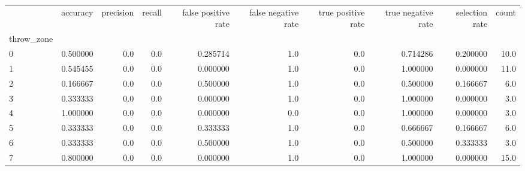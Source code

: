 \begin{tabular}{lrrrrrrrrr}
\toprule
{} &  accuracy &  precision &  recall &  false positive rate &  false negative rate &  true positive rate &  true negative rate &  selection rate &  count \\
throw\_zone &           &            &         &                      &                      &                     &                     &                 &        \\
\midrule
0          &  0.500000 &        0.0 &     0.0 &             0.285714 &                  1.0 &                 0.0 &            0.714286 &        0.200000 &   10.0 \\
1          &  0.545455 &        0.0 &     0.0 &             0.000000 &                  1.0 &                 0.0 &            1.000000 &        0.000000 &   11.0 \\
2          &  0.166667 &        0.0 &     0.0 &             0.500000 &                  1.0 &                 0.0 &            0.500000 &        0.166667 &    6.0 \\
3          &  0.333333 &        0.0 &     0.0 &             0.000000 &                  1.0 &                 0.0 &            1.000000 &        0.000000 &    3.0 \\
4          &  1.000000 &        0.0 &     0.0 &             0.000000 &                  0.0 &                 0.0 &            1.000000 &        0.000000 &    3.0 \\
5          &  0.333333 &        0.0 &     0.0 &             0.333333 &                  1.0 &                 0.0 &            0.666667 &        0.166667 &    6.0 \\
6          &  0.333333 &        0.0 &     0.0 &             0.500000 &                  1.0 &                 0.0 &            0.500000 &        0.333333 &    3.0 \\
7          &  0.800000 &        0.0 &     0.0 &             0.000000 &                  1.0 &                 0.0 &            1.000000 &        0.000000 &   15.0 \\
\bottomrule
\end{tabular}
